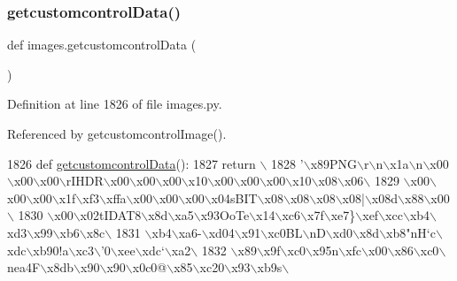 \subsubsection{\texorpdfstring{getcustomcontrol\+Data()}{getcustomcontrolData()}}
{\footnotesize\ttfamily def images.\+getcustomcontrol\+Data (\begin{DoxyParamCaption}{ }\end{DoxyParamCaption})}



Definition at line 1826 of file images.\+py.



Referenced by getcustomcontrol\+Image().


\begin{DoxyCode}
1826 \textcolor{keyword}{def }\hyperlink{namespaceimages_a24e2aa03f0ee46b3385dfd337dbc2d1c}{getcustomcontrolData}():
1827     \textcolor{keywordflow}{return} \(\backslash\)
1828 \textcolor{stringliteral}{'\(\backslash\)x89PNG\(\backslash\)r\(\backslash\)n\(\backslash\)x1a\(\backslash\)n\(\backslash\)x00\(\backslash\)x00\(\backslash\)x00\(\backslash\)rIHDR\(\backslash\)x00\(\backslash\)x00\(\backslash\)x00\(\backslash\)x10\(\backslash\)x00\(\backslash\)x00\(\backslash\)x00\(\backslash\)x10\(\backslash\)x08\(\backslash\)x06\(\backslash\)}
1829 \textcolor{stringliteral}{\(\backslash\)x00\(\backslash\)x00\(\backslash\)x00\(\backslash\)x1f\(\backslash\)xf3\(\backslash\)xffa\(\backslash\)x00\(\backslash\)x00\(\backslash\)x00\(\backslash\)x04sBIT\(\backslash\)x08\(\backslash\)x08\(\backslash\)x08\(\backslash\)x08|\(\backslash\)x08d\(\backslash\)x88\(\backslash\)x00\(\backslash\)}
1830 \textcolor{stringliteral}{\(\backslash\)x00\(\backslash\)x02tIDAT8\(\backslash\)x8d\(\backslash\)xa5\(\backslash\)x93OoTe\(\backslash\)x14\(\backslash\)xc6\(\backslash\)x7f\(\backslash\)xe7\}\(\backslash\)xef\(\backslash\)xcc\(\backslash\)xb4\(\backslash\)xd3\(\backslash\)x99\(\backslash\)xb6\(\backslash\)x8c\(\backslash\)}
1831 \textcolor{stringliteral}{\(\backslash\)xb4\(\backslash\)xa6-\(\backslash\)xd04\(\backslash\)x91\(\backslash\)xc0BL\(\backslash\)nD\(\backslash\)xd0\(\backslash\)x8d\(\backslash\)xb8"nH`c\(\backslash\)xdc\(\backslash\)xb90!a\(\backslash\)xc3\(\backslash\)'0\(\backslash\)xee\(\backslash\)xdc`\(\backslash\)xa2\(\backslash\)}
1832 \textcolor{stringliteral}{\(\backslash\)x89\(\backslash\)x9f\(\backslash\)xc0\(\backslash\)x95n\(\backslash\)xfc\(\backslash\)x00\(\backslash\)x86\(\backslash\)xc0\(\backslash\)nea4F\(\backslash\)x8db\(\backslash\)x90\(\backslash\)x90\(\backslash\)x0c0@\(\backslash\)x85\(\backslash\)xc20\(\backslash\)x93\(\backslash\)xb9s\(\backslash\)}

\end{DoxyCode}
